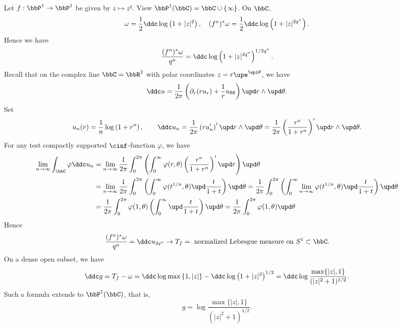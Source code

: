 \begin{example}[label=\labelNFM{eg:green-currents-of-power-map}, status=draft, tag=0000000]
	Let $f: \bbP^1 \to \bbP^1$ be given by $z \mapsto z^q$.
	View $\bbP^1(\bbC) = \bbC \cup \{\infty\}$.
	On $\bbC$,
	\[ \omega = \frac{1}{2} \ddc \log\left( 1 + |z|^2 \right), \quad  (f^n)^*\omega = \frac{1}{2} \ddc \log \left( 1 + |z|^{2q^n} \right). \]
	Hence we have
	\[  \frac{(f^n)^*\omega}{q^n} = \ddc \log \left( 1 + |z|^{2q^n} \right)^{1/2q^n}. \]
	Recall that on the complex line $\bbC = \bbR^2$ with polar coordinates $z=r\upe^{\upi \theta}$, we have
	\[ \ddc u = \frac{1}{2\pi} \left( \partial_r (r u_r) + \frac{1}{r} u_{\theta\theta} \right) \upd r \wedge \upd \theta. \]
	Set
	\[ u_n(r) = \frac{1}{n} \log \left( 1 + r^n \right), \qquad \ddc u_n = \frac{1}{2\pi} \left( r u_n'\right)' \upd r \wedge \upd \theta = \frac{1}{2\pi} \left( \frac{r^n}{1+r^n}\right)' \upd r \wedge \upd \theta. \]
	For any test compactly supported $\cinf$-function $\varphi$, we have
	\begin{align*}
		\lim_{n \to \infty} \int_\bbC \varphi \ddc u_n & = \lim_{n \to \infty} \frac{1}{2\pi} \int_0^{2\pi} \left( \int_0^\infty \varphi(r,\theta) \left( \frac{r^n}{1+r^n}\right)'\upd r \right) \upd \theta                                                                                                                          \\
		                                               & = \lim_{n \to \infty} \frac{1}{2\pi} \int_0^{2\pi} \left( \int_0^\infty \varphi(t^{1/n},\theta) \upd \frac{t}{1+t} \right) \upd \theta = \frac{1}{2\pi} \int_0^{2\pi} \left( \int_0^\infty \lim_{n \to \infty} \varphi(t^{1/n},\theta) \upd \frac{t}{1+t} \right) \upd \theta \\
		                                               & = \frac{1}{2\pi} \int_0^{2\pi} \varphi(1,\theta) \left( \int_0^\infty \upd \frac{t}{1+t}\right) \upd \theta = \frac{1}{2\pi} \int_0^{2\pi} \varphi(1,\theta) \upd \theta
	\end{align*}
	Hence
	\[ \frac{(f^n)^*\omega}{q^n} = \ddc u_{2q^n} \to T_f = \text{ normalized Lebesgue measure on } S^1 \subset \bbC. \]
	On a dense open subset, we have
	\[ \ddc g = T_f - \omega = \ddc \log \max \left\{1, |z|\right\} - \ddc \log\left( 1 + |z|^2 \right)^{1/2} = \ddc \log \frac{ \max \{ |z|, 1 \} }{ (|z|^2 + 1)^{1/2} }. \]
	Such a formula extends to $\bbP^1(\bbC)$, that is,
	\[ g = \log \frac{ \max \{ |z|, 1 \} }{ (|z|^2 + 1)^{1/2} }. \]
\end{example}

